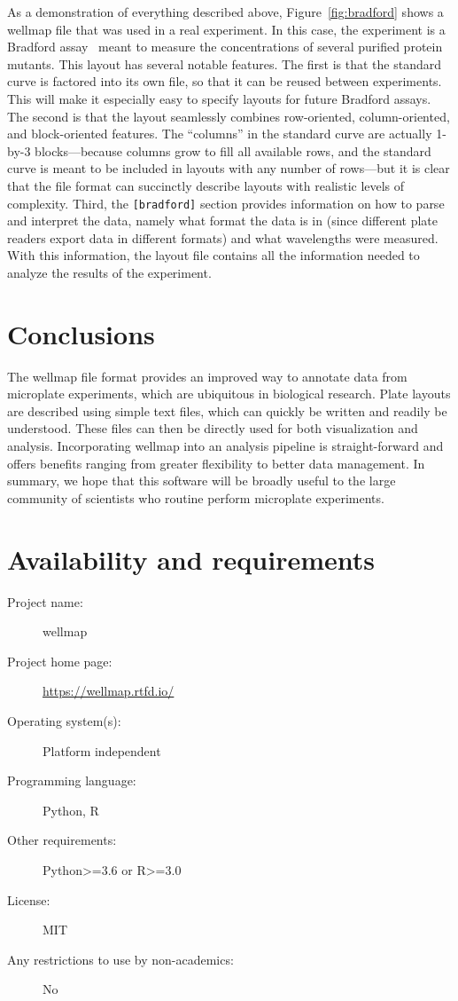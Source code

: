 \documentclass[twocolumn]{bmcart}
\begin{document}
As a demonstration of everything described above, Figure~\ref{fig:bradford}
shows a wellmap file that was used in a real experiment. In this case,
the experiment is a Bradford assay~\cite{bradford1976} meant to
measure the concentrations of several purified protein mutants. This
layout has several notable features. The first is that the standard
curve is factored into its own file, so that it can be reused between
experiments. This will make it especially easy to specify layouts
for future Bradford assays. The second is that the layout seamlessly
combines row-oriented, column-oriented, and block-oriented features.
The ``columns'' in the standard curve are actually 1-by-3 blocks---because
columns grow to fill all available rows, and the standard curve is
meant to be included in layouts with any number of rows---but it
is clear that the file format can succinctly describe layouts with
realistic levels of complexity. Third, the \texttt{{[}bradford{]}}
section provides information on how to parse and interpret the data,
namely what format the data is in (since different plate readers export
data in different formats) and what wavelengths were measured. With
this information, the layout file contains all the information needed
to analyze the results of the experiment.

\section*{Conclusions}

The wellmap file format provides an improved way to annotate data
from microplate experiments, which are ubiquitous in biological research.
Plate layouts are described using simple text files, which can quickly
be written and readily be understood. These files can then be directly
used for both visualization and analysis. Incorporating wellmap into
an analysis pipeline is straight-forward and offers benefits ranging
from greater flexibility to better data management. In summary, we
hope that this software will be broadly useful to the large community
of scientists who routine perform microplate experiments.

\section*{Availability and requirements}
\begin{description}
\item [Project name:] wellmap
\item [Project home page:] \url{https://wellmap.rtfd.io/}
\item [Operating system(s):] Platform independent
\item [Programming language:] Python, R
\item [Other requirements:] Python\textgreater=3.6 or R\textgreater=3.0
\item [License:] MIT
\item [Any restrictions to use by non-academics:] No
\end{description}
\end{document}
